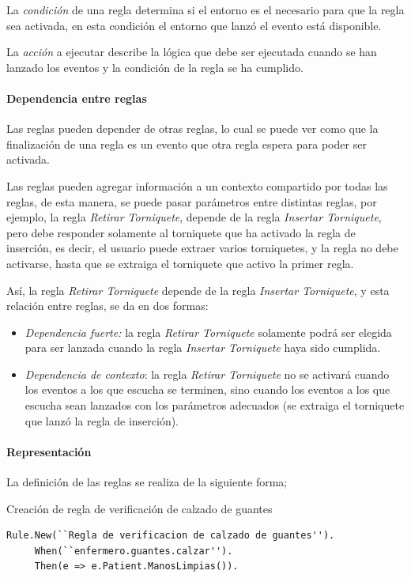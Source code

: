 La \emph{condición} de una regla determina si el entorno es el necesario para que la
regla sea activada, en esta condición el entorno que lanzó el evento está
disponible.

La \emph{acción} a ejecutar describe la lógica que debe ser ejecutada cuando se han
lanzado los eventos y la condición de la regla se ha cumplido.

\paragraph{Dependencia entre reglas}

Las reglas pueden depender de otras reglas, lo cual se puede ver como que la
finalización de una regla es un evento que otra regla espera para poder ser
activada.

Las reglas pueden agregar información a un contexto compartido por todas las
reglas, de esta manera, se puede pasar parámetros entre distintas reglas, por
ejemplo, la regla \emph{Retirar Torniquete}, depende de la regla \emph{Insertar
Torniquete}, pero debe responder solamente al torniquete que ha activado
la regla de inserción, es decir, el usuario puede extraer varios torniquetes, y
la regla no debe activarse, hasta que se extraiga el torniquete que activo la
primer regla.

Así, la regla \emph{Retirar Torniquete} depende de la regla \emph{Insertar
Torniquete}, y esta relación entre reglas, se da en dos
formas\cite{bailey2004event}:

\begin{itemize}
\item  \emph{Dependencia fuerte:} la regla \emph{Retirar Torniquete} solamente podrá
	ser elegida para ser lanzada cuando la regla \emph{Insertar Torniquete}
	haya sido cumplida.
\item  \emph{Dependencia de contexto}: la regla \emph{Retirar Torniquete} no se
	activará cuando los eventos a los que escucha se terminen, sino cuando
	los eventos a los que escucha sean lanzados con los parámetros adecuados
	(se extraiga el torniquete que lanzó la regla de inserción).
\end{itemize}

\paragraph{Representación}

La definición de las reglas se realiza de la siguiente forma;
\begin{algorithm}[H]
\caption{Creación de regla de verificación de calzado de guantes}
\label{alg:rule:guante}
\lstset{style=sharpc}
\begin{lstlisting}
Rule.New(``Regla de verificacion de calzado de guantes'').
     When(``enfermero.guantes.calzar'').
     Then(e => e.Patient.ManosLimpias()).
\end{lstlisting}
\end{algorithm}

